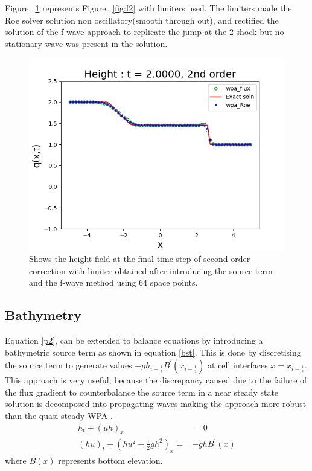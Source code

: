 \documentclass[12pt,a4paper]{article}
\newcommand{\donna}[1]{{\color{red}{#1}}}
\begin{document}
	Figure.~\ref{fig:f2lim} represents Figure.~\ref{fig:f2}  with limiters used. The limiters made the Roe solver solution non oscillatory(smooth through out), and rectified the solution of the f-wave approach to replicate the jump at the 2-shock but no stationary wave was present in the solution.
	\begin{figure}[H]
		\centering
		\includegraphics[width=0.5\linewidth]{images/2lim}
		\caption{Shows the height field at the final time step of second order correction with limiter obtained after introducing the source term and the f-wave method using 64 space points.}
		\label{fig:f2lim}
	\end{figure}
	\donna{Briefly mention higher order corrections ( but don't go into much detail).  You can mention a variety of solvers (e.g. MUSCL, Runge-Kutta (see Bunya paper)) and say they all have some way of extending to get higher order.}

	\subsection{Bathymetry}
	Equation \eqref{p2}, can be extended to balance equations by introducing a bathymetric source term as shown in equation \eqref{bst}. This is done by discretising the source term to generate values $-gh_{i-\frac{1}{2}}B^{\prime}(x_{i-\frac{1}{2}})$ at  cell interfaces  $x = x_{i-\frac{1}{2}}$. This approach is very useful, because the discrepancy caused due to the failure of the flux gradient to counterbalance the source term in a near steady state solution is decomposed into propagating waves  making the approach more robust than the quasi-steady WPA \cite{ba-le-mi-ro:2003}.
	\begin{equation}
		\begin{aligned}
			h_{t} + (uh)_x &= 0 \\
			(hu)_t + \left(hu^{2} + \frac{1}{2}gh^{2} \right)_x =& -ghB^{\prime}(x)
			\label{bst}
		\end{aligned}
	\end{equation}
	where $B(x)$ represents bottom elevation. \\
	
\end{document}
